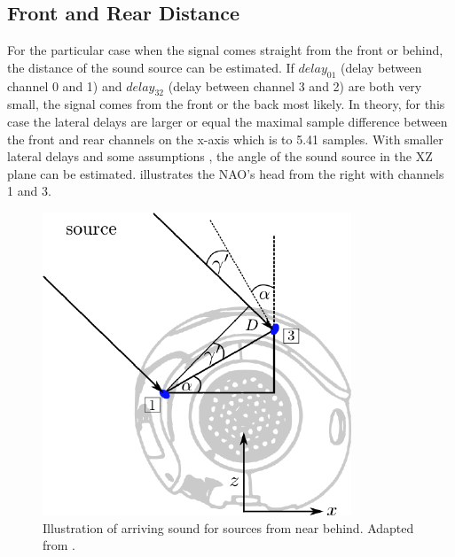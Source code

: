 \subsection{Front and Rear Distance}
\label{subsec:03_distance}


For the particular case when the signal comes straight from the front or behind,
the distance of the sound source can be estimated.
If $delay_{01}$ (delay between channel 0 and 1) and $delay_{32}$ (delay between channel 3 and 2)
are both very small, the signal comes from
the front or the back most likely.  
In theory, for this case the lateral delays are larger or equal the maximal
sample difference between the front and rear channels on the x-axis which is
to 5.41 samples.
With smaller lateral delays and some assumptions , the angle of the sound source in the XZ
plane can be estimated.
 illustrates the NAO's head from the right with
channels 1 and 3.
\begin{figure}[ht]
	\centering
		\includegraphics[width=0.45\columnwidth]{figures/side_head_tdoa}
    \caption{Illustration of arriving sound for sources from near behind.
             Adapted from \cite{nao_docu}.}
    \label{fig:02_headSideTdoa}
\end{figure}

